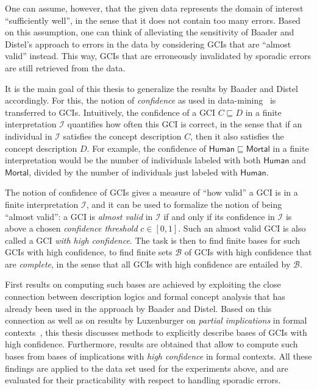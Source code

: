 \documentclass[english,fleqn]{scrartcl}
\begin{document}
One can assume, however, that the given data represents the domain of interest
\enquote{sufficiently well}, in the sense that it does not contain too many errors.  Based
on this assumption, one can think of alleviating the sensitivity of Baader and Distel's
approach to errors in the data by considering GCIs that are \enquote{almost valid}
instead.  This way, GCIs that are erroneously invalidated by sporadic errors are still
retrieved from the data.

It is the main goal of this thesis to generalize the results by Baader and Distel
accordingly.  For this, the notion of \emph{confidence} as used in
data-mining~\cite{arules:agrawal:association-rules} is transferred to GCIs.  Intuitively,
the confidence of a GCI $C \sqsubseteq D$ in a finite interpretation $\mathcal{I}$
quantifies how often this GCI is correct, in the sense that if an individual in
$\mathcal{I}$ satisfies the concept description $C$, then it also satisfies the concept
description $D$.  For example, the confidence of $\mathsf{Human} \sqsubseteq
\mathsf{Mortal}$ in a finite interpretation would be the number of individuals labeled
with both $\mathsf{Human}$ and $\mathsf{Mortal}$, divided by the number of individuals
just labeled with $\mathsf{Human}$.

The notion of confidence of GCIs gives a measure of \enquote{how valid} a GCI is in a
finite interpretation $\mathcal{I}$, and it can be used to formalize the notion of being
\enquote{almost valid}: a GCI is \emph{almost valid} in $\mathcal{I}$ if and only if its
confidence in $\mathcal{I}$ is above a chosen \emph{confidence threshold} $c \in [0,1]$.
Such an almost valid GCI is also called a GCI \emph{with high confidence}.  The task is
then to find finite bases for such GCIs with high confidence, \ie to find finite sets
$\mathcal{B}$ of GCIs with high confidence that are \emph{complete}, in the sense that all
GCIs with high confidence are entailed by $\mathcal{B}$.

First results on computing such bases are achieved by exploiting the close connection
between description logics and formal concept analysis that has already been used in the
approach by Baader and Distel.  Based on this connection as well as on results by
Luxenburger on \emph{partial implications} in formal contexts~\cite{diss:Luxenburger},
this thesis discusses methods to explicitly describe bases of GCIs with high confidence.
Furthermore, results are obtained that allow to compute such bases from bases of
implications with \emph{high confidence} in formal contexts.  All these findings are
applied to the data set used for the experiments above, and are evaluated for their
practicability with respect to handling sporadic errors.
\end{document}
